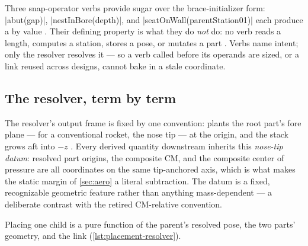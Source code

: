 Three snap-operator verbs provide sugar over the brace-initializer form:
\cppinline|abut(gap)|, \cppinline|nestInBore(depth)|, and
\cppinline|seatOnWall(parentStation01)| each produce a  by value
. Their defining property is what they do \emph{not} do:
no verb reads a length, computes a station, stores a pose, or mutates a part
. Verbs name intent; only the resolver resolves it ---
so a verb called before its operands are sized, or a link reused across designs, cannot
bake in a stale coordinate.


\subsection{The resolver, term by term}\label{sec:placement-resolver}

The resolver's output frame is fixed by one convention:  plants the root part's fore plane --- for a conventional rocket, the nose tip
--- at the origin, and the stack grows aft into $-z$
. Every derived quantity downstream inherits this
\emph{nose-tip datum}: resolved part origins, the composite CM, and the composite center
of pressure are all coordinates on the same tip-anchored axis, which is what makes the
static margin of \cref{sec:aero} a literal subtraction. The datum is a fixed, recognizable
geometric feature rather than anything mass-dependent --- a deliberate contrast with the
retired CM-relative convention.

Placing one child is a pure function of the parent's resolved pose, the two parts'
geometry, and the link (\cref{lst:placement-resolver}).

